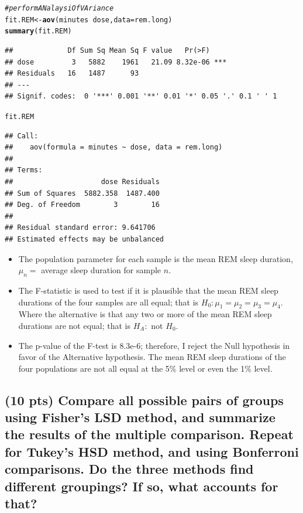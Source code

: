 \documentclass{article}\usepackage[]{graphicx}\usepackage[]{color}
\makeatletter
\newcommand{\hlcom}[1]{\textcolor[rgb]{0.678,0.584,0.686}{\textit{#1}}}%
\newcommand{\hlopt}[1]{\textcolor[rgb]{0,0,0}{#1}}%
\newcommand{\hlstd}[1]{\textcolor[rgb]{0.345,0.345,0.345}{#1}}%
\newcommand{\hlkwb}[1]{\textcolor[rgb]{0.69,0.353,0.396}{#1}}%
\newcommand{\hlkwc}[1]{\textcolor[rgb]{0.333,0.667,0.333}{#1}}%
\newcommand{\hlkwd}[1]{\textcolor[rgb]{0.737,0.353,0.396}{\textbf{#1}}}%
\newenvironment{kframe}{%
 \def\at@end@of@kframe{}%
 \ifinner\ifhmode%
  \def\at@end@of@kframe{\end{minipage}}%
  \begin{minipage}{\columnwidth}%
 \fi\fi%
 \def\FrameCommand##1{\hskip\@totalleftmargin \hskip-\fboxsep
 \colorbox{shadecolor}{##1}\hskip-\fboxsep
     \hskip-\linewidth \hskip-\@totalleftmargin \hskip\columnwidth}%
 \MakeFramed {\advance\hsize-\width
   \@totalleftmargin\z@ \linewidth\hsize
   \@setminipage}}%
 {\par\unskip\endMakeFramed%
 \at@end@of@kframe}
\newenvironment{knitrout}{}{} %
\makeatother
\begin{document}
\begin{knitrout}
\color{fgcolor}\begin{kframe}
\begin{alltt}
\hlcom{# perform ANalaysi Of VAriance}
\hlstd{fit.REM} \hlkwb{<-} \hlkwd{aov}\hlstd{(minutes} \hlopt{~} \hlstd{dose,} \hlkwc{data} \hlstd{= rem.long)}
\hlkwd{summary}\hlstd{(fit.REM)}
\end{alltt}
\begin{verbatim}
##             Df Sum Sq Mean Sq F value   Pr(>F)    
## dose         3   5882    1961   21.09 8.32e-06 ***
## Residuals   16   1487      93                     
## ---
## Signif. codes:  0 '***' 0.001 '**' 0.01 '*' 0.05 '.' 0.1 ' ' 1
\end{verbatim}
\begin{alltt}
\hlstd{fit.REM}
\end{alltt}
\begin{verbatim}
## Call:
##    aov(formula = minutes ~ dose, data = rem.long)
## 
## Terms:
##                     dose Residuals
## Sum of Squares  5882.358  1487.400
## Deg. of Freedom        3        16
## 
## Residual standard error: 9.641706
## Estimated effects may be unbalanced
\end{verbatim}
\end{kframe}
\end{knitrout}
\begin{itemize}
\item The population parameter for each sample is the mean REM sleep duration, $\mu_n = $ average sleep duration for sample $n$.

\item The F-statistic is used to test if it is plausible that the mean REM sleep durations of the four samples are all equal; that is $H_0: \mu_1 = \mu_2 = \mu_3 = \mu_4$.  Where the alternative is that any two or more of the mean REM sleep durations are not equal; that is $H_A:$ not $H_0$.

\item The p-value of the F-test is 8.3e-6; therefore, I reject the Null hypothesis in favor of the Alternative hypothesis.  The mean REM sleep durations of the four populations are not all equal at the 5\% level or even the 1\% level.

\end{itemize}

\subsection{(10 pts) Compare all possible pairs of groups using Fisher’s LSD method, and summarize the results of the multiple comparison. Repeat for Tukey’s HSD method, and using Bonferroni comparisons. Do the three methods find different groupings? If so, what accounts for that?}
\end{document}
